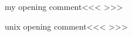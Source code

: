 \documentclass{article}
\begin{document}
\<my opening comment\><<<
>>>

\<unix opening comment\><<<
>>>
\end{document}

